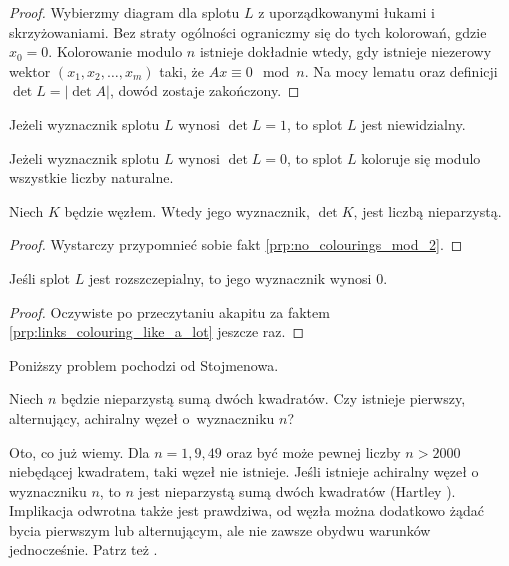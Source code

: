 \begin{proof}
    Wybierzmy diagram dla splotu $L$ z uporządkowanymi łukami i skrzyżowaniami.
    Bez straty ogólności ograniczmy się do tych kolorowań, gdzie $x_0 = 0$.
    Kolorowanie modulo $n$ istnieje dokładnie wtedy, gdy istnieje niezerowy wektor $(x_1, x_2, \ldots, x_m)$ taki, że $Ax \equiv 0 \mod n$.
    Na mocy lematu oraz definicji $\det L = |\det A|$, dowód zostaje zakończony.
\end{proof}

\begin{corollary}
%
    Jeżeli wyznacznik splotu $L$ wynosi $\det L = 1$, to splot $L$ jest niewidzialny.
\end{corollary}

\begin{corollary}
    Jeżeli wyznacznik splotu $L$ wynosi $\det L = 0$, to splot $L$ koloruje się modulo wszystkie liczby naturalne.
\end{corollary}

\begin{corollary}
    \label{cor:knot_determinant_odd}%
    Niech $K$ będzie węzłem.
    Wtedy jego wyznacznik, $\det K$, jest liczbą nieparzystą.
\end{corollary}

\begin{proof}
    Wystarczy przypomnieć sobie fakt \ref{prp:no_colourings_mod_2}.
\end{proof}


\begin{corollary}
        Jeśli splot $L$ jest rozszczepialny, to jego wyznacznik wynosi $0$.
    \end{corollary}
    
    \begin{proof}
        Oczywiste po przeczytaniu akapitu za faktem \ref{prp:links_colouring_like_a_lot} jeszcze raz.
    \end{proof}

Poniższy problem pochodzi od Stojmenowa.
%

\begin{conjecture}
    Niech $n$ będzie nieparzystą sumą dwóch kwadratów.
    Czy istnieje pierwszy, alternujący, achiralny węzeł o~wyznaczniku $n$?
\end{conjecture}

Oto, co już wiemy.
Dla $n = 1, 9, 49$ oraz być może pewnej liczby $n > 2000$ niebędącej kwadratem, taki węzeł nie istnieje.
Jeśli istnieje achiralny węzeł o wyznaczniku $n$, to $n$ jest nieparzystą sumą dwóch kwadratów (Hartley \cite{hartley1979}).
%
Implikacja odwrotna także jest prawdziwa, od węzła można dodatkowo żądać bycia pierwszym lub alternującym, ale nie zawsze obydwu warunków jednocześnie.
Patrz też \cite{stoimenow2005}.
%


